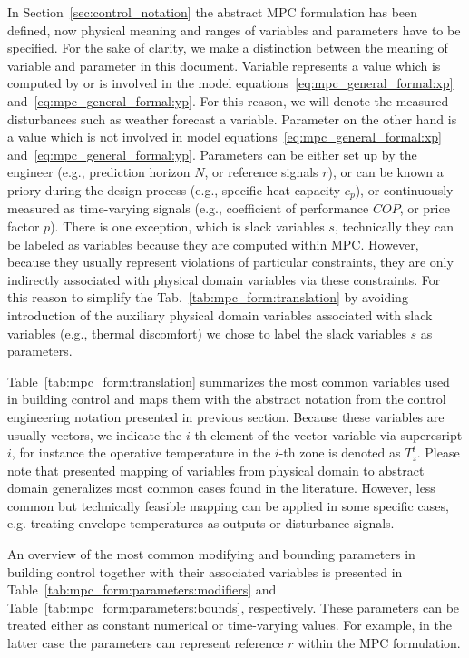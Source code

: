\documentclass[10pt]{extarticle}
\begin{document}
In Section~\ref{sec:control_notation} the abstract MPC formulation has been defined, now physical meaning and ranges of variables and parameters have to be specified.
% 
For the sake of clarity, we make a distinction between the meaning of variable and parameter in this document.
Variable represents a value which is computed by or is involved  in the model equations~\eqref{eq:mpc_general_formal:xp} and~\eqref{eq:mpc_general_formal:yp}. For this reason, we will denote the measured disturbances such as weather forecast a variable.
Parameter on the other hand is a value which is not involved in model equations~\eqref{eq:mpc_general_formal:xp} and~\eqref{eq:mpc_general_formal:yp}. Parameters can be
 either set up by the engineer (e.g., prediction horizon $N$, or reference  signals $r$), or can be known a priory during the design process (e.g., specific  heat capacity $c_p$), or continuously measured as time-varying signals (e.g., coefficient of performance $COP$, or price factor $p$).
 There is one exception, which is slack variables $s$, technically they can be labeled as variables because they are computed within MPC.
However, because they usually represent violations of particular constraints, they are only indirectly associated with physical domain variables via these constraints.
For this reason to simplify the Tab.~\ref{tab:mpc_form:translation} by avoiding introduction of the auxiliary physical domain variables associated with slack variables (e.g., thermal discomfort) we chose to label the slack variables $s$ as parameters.

Table~\ref{tab:mpc_form:translation} summarizes the most common
variables used in building control and maps them with the abstract
notation from the control engineering notation presented in previous section. 
Because these variables are usually vectors, we indicate the
$i$-th element of the vector variable via supercsript $i$,
for instance the operative temperature in the $i$-th zone is denoted as $T_z^i$.
Please note that presented mapping of  variables from physical domain to abstract domain generalizes most common cases found in the literature. However, less common 
but technically feasible mapping can be applied in some specific cases, e.g. treating envelope temperatures as outputs or disturbance signals.


An overview of the most common modifying and bounding parameters in building control together with their associated variables is presented in Table~\ref{tab:mpc_form:parameters:modifiers} and Table~\ref{tab:mpc_form:parameters:bounds}, respectively.
These parameters can be treated either as constant numerical  or time-varying values. For example, in the latter case the parameters can represent reference $r$ within the MPC formulation.
\end{document}
